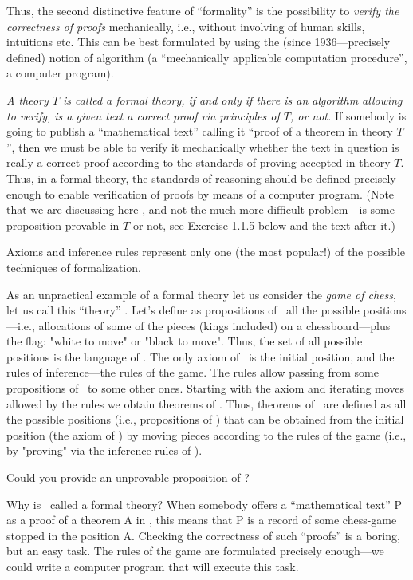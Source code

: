 Thus, the second distinctive feature of ``formality'' is the possibility to \emph{verify the correctness of proofs} mechanically, i.e., without involving of human skills, intuitions etc.
This can be best formulated by using the (since 1936---precisely defined) notion of algorithm (a ``mechanically applicable computation procedure'', a computer program).

\emph{A theory \(T\) is called a formal theory, if and only if there is an algorithm allowing to verify, is a given text a correct proof via principles of \(T\), or not.}
If somebody is going to publish a ``mathematical text'' calling it ``proof of a theorem in theory \(T\)'', then we must be able to verify it mechanically whether the text in question is really a correct proof according to the standards of proving accepted in theory \(T\).
Thus, in a formal theory, the standards of reasoning should be defined precisely enough to enable verification of proofs by means of a computer program.
(Note that we are discussing here , and not the much more difficult problem---is some proposition provable in \(T\) or not, see Exercise 1.1.5 below and the text after it.)

Axioms and inference rules represent only one (the most popular!) of the possible techniques of formalization.

As an unpractical example of a formal theory let us consider the \emph{game of chess}, let us call this ``theory'' \CHESS.
Let's define as propositions of \CHESS\ all the possible positions---i.e., allocations of some of the pieces (kings included) on a chessboard---plus the flag: "white to move" or "black to move".
Thus, the set of all possible positions is the language of \CHESS.
The only axiom of \CHESS\ is the initial position, and the rules of inference---the rules of the game.
The rules allow passing from some propositions of \CHESS\ to some other ones.
Starting with the axiom and iterating moves allowed by the rules we obtain theorems of \CHESS.
Thus, theorems of \CHESS\ are defined as all the possible positions (i.e., propositions of \CHESS) that can be obtained from the initial position (the axiom of \CHESS) by moving pieces according to the rules of the game (i.e., by "proving" via the inference rules of \CHESS).

\begin{exercise}
Could you provide an unprovable proposition of \CHESS?
\end{exercise}

Why is \CHESS\ called a formal theory? When somebody offers a ``mathematical text'' P as a proof of a theorem A in \CHESS, this means that P is a record of some chess-game stopped in the position A.
Checking the correctness of such ``proofs'' is a boring, but an easy task.
The rules of the game are formulated precisely enough---we could write a computer program that will execute this task.

